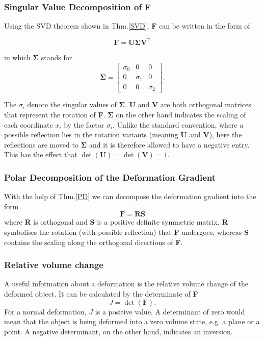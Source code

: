 \subsubsection{Singular Value Decomposition of F}

Using the SVD theorem shown in Thm.\ref{SVD}, \textbf{F} can be written in the form of

\begin{equation}\label{eq:svd_gradient}
\mathbf{F} = \mathbf{U \Sigma V^\intercal}
\end{equation}

in which $\mathbf{\Sigma}$ stands for
\begin{equation}\label{eq:svd_simga}
\mathbf{\Sigma} = \left[\begin{matrix}  \sigma_0 & 0 & 0 \\ 0 & \sigma_1 & 0 \\ 0 & 0 & \sigma_2 \end{matrix}\right] .
\end{equation}

The $\sigma_i$ denote the singular values of $\mathbf{\Sigma}$.
\textbf{U} and $\mathbf{V}$ are both orthogonal matrices that represent the rotation of \textbf{F}. $\mathbf{\Sigma}$ on the other hand indicates the scaling of each coordinate $x_i$ by the factor $\sigma_i$. Unlike the standard convention, where a possible reflection lies in the rotation variants (meaning \textbf{U} and \textbf{V}), here the reflections are moved to $\mathbf{\Sigma}$ and it is therefore allowed to have a negative entry. This has the effect that $\operatorname{det}(\mathbf{U}) = \operatorname{det}(\mathbf{V}) =1$.


\subsubsection{Polar Decomposition of the Deformation Gradient}
With the help of Thm.\ref{PD} we can decompose the deformation gradient into the form
\begin{equation}\label{PD_DG}
	\mathbf{F} = \mathbf{RS}
\end{equation}
where \textbf{R} is orthogonal and \textbf{S} is a positive definite symmetric matrix. \textbf{R} symbolises the rotation (with possible reflection) that \textbf{F} undergoes, whereas \textbf{S} contains the scaling along the orthogonal directions of \textbf{F}.

\subsubsection{Relative volume change}
A useful information about a deformation is the relative volume change of the deformed object. It can be calculated by the determinate of \textbf{F}
\begin{equation}\label{det_DG}
	J = \operatorname{det}(\mathbf{F}).
\end{equation}
For a normal deformation, $J$ is a positive value. A determinant of zero would mean that the object is being deformed into a zero volume state, e.g. a plane or a point. A negative determinant, on the other hand, indicates an inversion.


